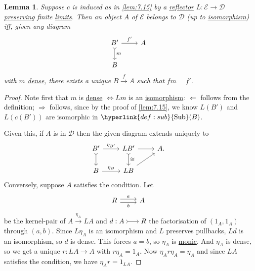 \documentclass{article}
\DeclareMathOperator{\Sub}{Sub}
\newcommand{\dc}{\mathscr{D}}
\newcommand{\ec}{\mathscr{E}}
\newenvironment{tikzcdi}{\begin{tikzcd}[cramped, sep=scriptsize]}{\end{tikzcd}}
\let\to\longrightarrow
\newtheorem{nlemma}[nthm]{Lemma}
\begin{document}
\begin{nlemma}\label{lem:7.18}
  Suppose $c$ is induced as in \cref{lem:7.15} by a \hyperlink{def:refl}{reflector} $L: \ec \to \dc$
  \hyperlink{def:plim}{preserving} finite \hyperlink{def:limit}{limits}.
  Then an object $A$ of $\ec$ belongs to $\dc$ (up to \hyperlink{def:iso}{isomorphism}) iff, given any diagram
  \begin{equation*}
  \begin{tikzcd}
    B' \dar[tail]{m} \rar{f'} & A \\
    B
  \end{tikzcd}
  \end{equation*}
  with $m$ \hyperlink{def:denseclosed}{dense}, there exists a unique $B \overset{f}\to A$ such that $fm=f'$.
\end{nlemma}
\begin{proof}
  Note first that $m$ is \hyperlink{def:denseclosed}{dense} $\iff Lm$ is an \hyperlink{def:iso}{isomorphism}:
  $\Leftarrow$ follows from the definition; $\Rightarrow$ follows, since by the proof of \cref{lem:7.15}, we know $L(B')$ and $L(c(B'))$ are isomorphic in $\hyperlink{def:sub}{\Sub}(B)$.

  Given this, if $A$ is in $\dc$ then the given diagram extends uniquely to
  \begin{equation*}
    \begin{tikzcd}
      B' \rar{\eta_{B'}} \dar[tail] & LB' \dar[tail]{\cong} \rar& A. \\
      B \rar{\eta_B}& LB \arrow[ur]
    \end{tikzcd}
  \end{equation*}
  Conversely, suppose $A$ satisfies the condition.
  Let
  \begin{equation*}
    \begin{tikzcd}
      R \rar[shift left]{a} \rar[shift right,']{b} & A
    \end{tikzcd}
  \end{equation*}
  be the kernel-pair of $A \overset{\eta_A}{\to} LA$ and $d: \begin{tikzcdi}A \rar[tail]& R\end{tikzcdi}$ the factorisation of $(1_A,1_A)$ through $(a,b)$.
  Since $L \eta_A$ is an isomorphism and $L$ preserves pullbacks, $Ld$ is an isomorphism, so $d$ is dense.
  This forces $a=b$, so $\eta_A$ is \hyperlink{def:monic}{monic}.
  And $\eta_A$ is dense, so we get a unique $r: LA \to A$ with $r \eta_A = 1_A$.
  Now $\eta_A r \eta_A = \eta_A$ and since $LA$ satisfies the condition, we have $\eta_A r = 1_{LA}$.
\end{proof}
\end{document}
